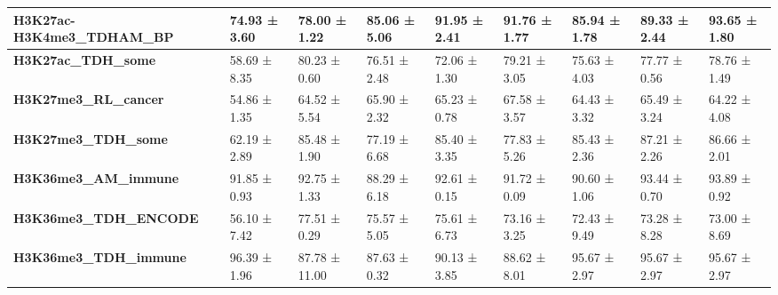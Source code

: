 \documentclass[12pt]{article}
\begin{document}
\begin{table}
\begin{tabular}{|lllllllll|}
\textbf{H3K27ac-H3K4me3\_TDHAM\_BP}    & 74.93 ± 3.60                           & 78.00 ± 1.22                         & 85.06 ± 5.06                       & 91.95 ± 2.41                               & 91.76 ± 1.77                        & 85.94 ± 1.78                        & 89.33 ± 2.44                        & {\color[HTML]{CB0000} 93.65 ± 1.80} \\ \hline
\textbf{H3K27ac\_TDH\_some}            & 58.69 ± 8.35                           & {\color[HTML]{CB0000} 80.23 ± 0.60}  & 76.51 ± 2.48                       & 72.06 ± 1.30                               & 79.21 ± 3.05                        & 75.63 ± 4.03                        & 77.77 ± 0.56                        & 78.76 ± 1.49                        \\ \hline
\textbf{H3K27me3\_RL\_cancer}          & 54.86 ± 1.35                           & 64.52 ± 5.54                         & 65.90 ± 2.32                       & 65.23 ± 0.78                               & {\color[HTML]{CB0000} 67.58 ± 3.57} & 64.43 ± 3.32                        & 65.49 ± 3.24                        & 64.22 ± 4.08                        \\ \hline
\textbf{H3K27me3\_TDH\_some}           & 62.19 ± 2.89                           & 85.48 ± 1.90                         & 77.19 ± 6.68                       & 85.40 ± 3.35                               & 77.83 ± 5.26                        & 85.43 ± 2.36                        & {\color[HTML]{CB0000} 87.21 ± 2.26} & 86.66 ± 2.01                        \\ \hline
\textbf{H3K36me3\_AM\_immune}          & 91.85 ± 0.93                           & 92.75 ± 1.33                         & 88.29 ± 6.18                       & 92.61 ± 0.15                               & 91.72 ± 0.09                        & 90.60 ± 1.06                        & 93.44 ± 0.70                        & {\color[HTML]{CB0000} 93.89 ± 0.92} \\ \hline
\textbf{H3K36me3\_TDH\_ENCODE}         & 56.10 ± 7.42                           & {\color[HTML]{CB0000} 77.51 ± 0.29}  & 75.57 ± 5.05                       & 75.61 ± 6.73                               & 73.16 ± 3.25                        & 72.43 ± 9.49                        & 73.28 ± 8.28                        & 73.00 ± 8.69                        \\ \hline
\textbf{H3K36me3\_TDH\_immune}         & {\color[HTML]{CB0000} 96.39 ± 1.96}    & 87.78 ± 11.00                        & 87.63 ± 0.32                       & 90.13 ± 3.85                               & 88.62 ± 8.01                        & 95.67 ± 2.97                        & 95.67 ± 2.97                        & 95.67 ± 2.97                        \\ \hline

\end{tabular}
\end{table}
\end{document}
